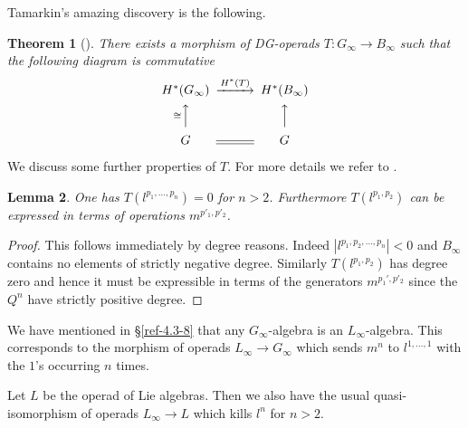 \documentclass{amsart}
\numberwithin{equation}{section}
\newtheorem{lemma}{Lemma}[section]
\newtheorem{theorem}[lemma]{Theorem}
\theoremstyle{definition}
\theoremstyle{remark}
\begin{document}
Tamarkin's
amazing discovery is the following.
\begin{theorem}[\cite{Tamarkin}]
There exists a morphism of DG-operads $T:G_\infty\rightarrow B_\infty$ such that the
following diagram is commutative 
\[
\begin{CD}
H^\ast(G_\infty) @>H^\ast(T)>> H^\ast(B_\infty)\\
@A\cong AA @AAA\\
G@= G
\end{CD}
\]
\end{theorem}
We discuss some further properties of $T$. For more details we refer to
\cite{Tamarkin}.  
\begin{lemma}
\label{ref-5.2-10}
One has $T(l^{p_1,\ldots,p_n})=0$ for $n>2$. Furthermore $T(l^{p_1,p_2})$
can be expressed in terms of operations $m^{p'_1,p'_2}$.
\end{lemma}
\begin{proof} This follows immediately by degree reasons. Indeed
  $|l^{p_1,p_2,\ldots,p_n}|<0$ and $B_\infty$ contains no elements of
  strictly negative degree. Similarly $T(l^{p_1,p_2})$ has degree zero
  and hence it must be expressible in terms of the generators
  $m^{p_1',p'_2}$ since the $Q^n$ have strictly positive degree.
\end{proof}
We have mentioned in \S\ref{ref-4.3-8} that any $G_\infty$-algebra is an $L_\infty$-algebra. This
corresponds to the morphism of operads $L_\infty\rightarrow G_\infty$ which
sends $m^n$ to $l^{1,\ldots,1}$ with the $1$'s occurring $n$ times. 

Let $L$ be the operad of Lie algebras. Then we also have the usual
quasi-isomorphism of operads $L_\infty\rightarrow L$ which kills $l^n$ for
$n>2$.
\end{document}

